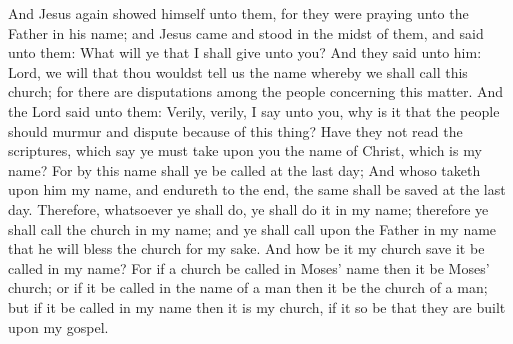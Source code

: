 \bverse \iffalse And Jesus again showed himself unto them, for they were praying unto the Father in his name; and Jesus came and stood in the midst of them, and said unto them: What will ye that I shall give unto you? \fi
And Jesus again showed himself unto them, for they were praying unto the Father in his name; and Jesus came and stood in the midst of them, and said unto them: What will ye that I shall give unto you?
\bverse \iffalse And they said unto him: Lord, we will that thou wouldst tell us the name whereby we shall call this church; for there are disputations among the people concerning this matter. \fi
And they said unto him: Lord, we will that thou wouldst tell us the name whereby we shall call this church; for there are disputations among the people concerning this matter.
\bverse \iffalse And the Lord said unto them: Verily, verily, I say unto you, why is it that the people should murmur and dispute because of this thing? \fi
And the Lord said unto them: Verily, verily, I say unto you, why is it that the people should murmur and dispute because of this thing?
\bverse \iffalse Have they not read the scriptures, which say ye must take upon you the name of Christ, which is my name? For by this name shall ye be called at the last day; \fi
Have they not read the scriptures, which say ye must take upon you the name of Christ, which is my name? For by this name shall ye be called at the last day;
\bverse \iffalse And whoso taketh upon him my name, and endureth to the end, the same shall be saved at the last day. \fi
And whoso taketh upon him my name, and endureth to the end, the same shall be saved at the last day.
\bverse \iffalse Therefore, whatsoever ye shall do, ye shall do it in my name; therefore ye shall call the church in my name; and ye shall call upon the Father in my name that he will bless the church for my sake. \fi
Therefore, whatsoever ye shall do, ye shall do it in my name; therefore ye shall call the church in my name; and ye shall call upon the Father in my name that he will bless the church for my sake.
\bverse \iffalse And how be it my church save it be called in my name? For if a church be called in Moses' name then it be Moses' church; or if it be called in the name of a man then it be the church of a man; but if it be called in my name then it is my church, if it so be that they are built upon my gospel. \fi
And how be it my church save it be called in my name? For if a church be called in Moses' name then it be Moses' church; or if it be called in the name of a man then it be the church of a man; but if it be called in my name then it is my church, if it so be that they are built upon my gospel.
